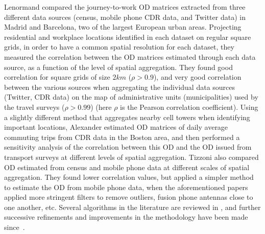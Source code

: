 Lenormand \et\cite{lenormand_2014_cross} compared the journey-to-work OD matrices extracted from three different data sources (census, mobile phone CDR data, and Twitter data) in Madrid and Barcelona, two of the largest European urban areas. Projecting residential and workplace locations identified in each dataset on regular square grids, in order to have a common spatial resolution for each dataset, they measured the correlation between the OD matrices estimated through each data source, as a function of the level of spatial aggregation. They found good correlation for square grids of size $2km$ ($\rho > 0.9$), and very good correlation between the various sources when aggregating the individual data sources (Twitter, CDR data) on the map of administrative units (municipalities) used by the travel surveys ($\rho > 0.99$) (here $\rho$ is the Pearson correlation coefficient). Using a slightly different method that aggregates nearby cell towers when identifying important locations, Alexander \et\cite{alexander_2015_origin} estimated OD matrices of daily average commuting trips from CDR data in the Boston area, and then performed a sensitivity analysis of the correlation between this OD and the OD issued from transport surveys at different levels of spatial aggregation. Tizzoni \et\cite{tizzoni_2014_use} also compared OD estimated from census and mobile phone data at different scales of spatial aggregation. They found lower correlation values, but applied a simpler method to estimate the OD from mobile phone data, when the aforementioned papers applied more stringent filters to remove outliers, fusion phone antennas close to one another, etc. Several algorithms in the literature are reviewed in \cite{toole_2015_path}, and further successive refinements and improvements in the methodology have been made since~\cite{jiang_2013_review,iqbal_2014_development,c_2015_analyzing,alexander_2015_origin}.




